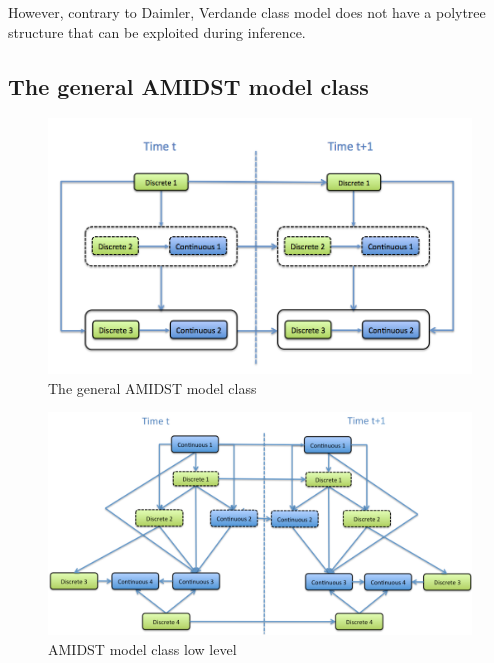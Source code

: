 However, contrary to Daimler, Verdande class model does not have a polytree structure that can be exploited during inference. 

\subsection{The general AMIDST model class}

\begin{figure}[ht!]
\begin{center}
\includegraphics[scale=0.4]{./figures/AMIDSTModelClassGeneral}
\caption{\label{Figure:AMIDSTModelClassHighLevel} The general AMIDST model class}
\end{center}
\end{figure}

\begin{figure}[ht!]
\begin{center}
\includegraphics[scale=0.39]{./figures/AMIDSTModelClass}
\caption{\label{Figure:AMIDSTModelClass} AMIDST model class low level}
\end{center}
\end{figure}

